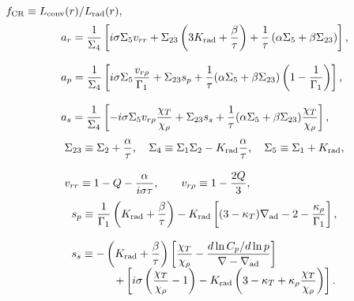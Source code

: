\documentclass[fleqn,usenatbib]{mnras}
\begin{document}
$f_{\rm CR}\equiv L_{\rm conv}(r)/L_{\rm rad}(r),$
\begin{equation*}
\begin{array}{ll}\displaystyle
a_r ={1\over \Sigma_4}\left[i\sigma\Sigma_5v_{rr}
+\Sigma_{23}\left(3K_{\rm rad}+{\beta\over\tau}\right)
+{1\over\tau}\left(\alpha\Sigma_5+\beta\Sigma_{23}\right)\right],
\cr\cr\displaystyle
a_p={1\over \Sigma_4}\left[
i\sigma\Sigma_5{v_{r\rho}\over\Gamma_1}
+\Sigma_{23}s_p+{1\over\tau}(\alpha\Sigma_5+\beta\Sigma_{23})\left(1-{1\over\Gamma_1}\right)
\right],
\cr\cr\displaystyle
a_s={1\over \Sigma_4}\left[-i\sigma\Sigma_5v_{r\rho}{\chi_T\over\chi_\rho}
+\Sigma_{23}s_s
+{1\over\tau}(\alpha\Sigma_5+\beta\Sigma_{23}){\chi_T\over\chi_\rho}\right],
\end{array}
\end{equation*}
%
\begin{equation*}
\begin{array}{ll}\displaystyle
\Sigma_{23} \equiv \Sigma_2 +{\alpha\over\tau}, \quad
\Sigma_4 \equiv \Sigma_1\Sigma_2-K_{\rm rad}{\alpha\over\tau},
\quad \Sigma_5 \equiv \Sigma_1+K_{\rm rad},
\cr\cr \displaystyle
v_{rr} \equiv 1-Q-{\alpha\over i\sigma\tau}, 
\qquad
v_{r\rho} \equiv  1-{2Q\over3}, 
\end{array}
\end{equation*}
%
\begin{equation*}
\begin{array}{ll}\displaystyle
s_p \equiv {1\over\Gamma_1}\left(K_{\rm rad}+{\beta\over\tau}\right)
-K_{\rm rad}\left[(3-\kappa_T)\nabla_{\rm ad}-2-{\kappa_\rho \over \Gamma_1}\right],
\cr\cr\displaystyle
s_s \equiv -\left(K_{\rm rad}+{\beta\over\tau}\right)
\left[{\chi_T\over\chi_\rho}-{d\ln C_p/d\ln p\over \nabla-\nabla_{\rm ad}}\right] 
\cr \qquad \qquad \displaystyle
+\left[i\sigma\left({\chi_T\over\chi_\rho}-1\right)-K_{\rm rad}\left(3-\kappa_T +\kappa_\rho{\chi_T\over\chi_\rho}\right)\right].
\end{array}
\end{equation*}



\bsp	%
\label{lastpage}
\end{document}
